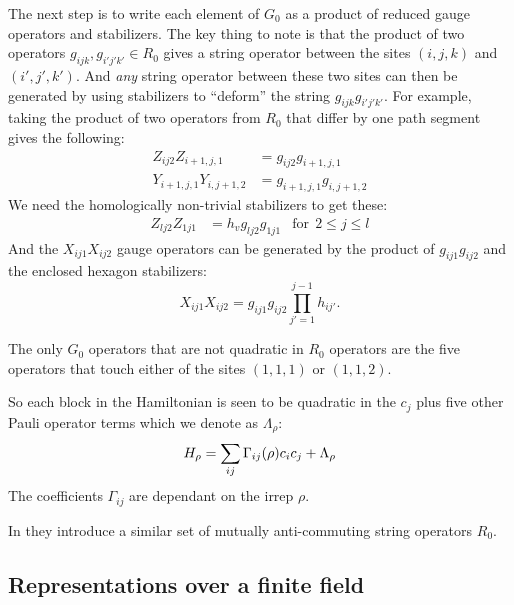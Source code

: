 \documentclass[12pt]{article}
\begin{document}
The next step is to write each element of $G_0$
as a product of reduced gauge operators and stabilizers.
The key thing to note is that the product of two
operators $g_{ijk}, g_{i'j'k'}\in R_0$ gives a string
operator between the sites $(i,j,k)$ and $(i',j',k')$.
And {\it any} string operator between these
two sites can then be generated by using stabilizers to
``deform'' the string $g_{ijk}g_{i'j'k'}.$
For example, taking the product
of two operators from $R_0$ that differ
by one path segment gives the following:
\begin{align*}
Z_{ij2}Z_{i+1,j,1} &= g_{ij2} g_{i+1,j,1} \\
Y_{i+1,j,1}Y_{i,j+1,2} &= g_{i+1,j,1}g_{i,j+1,2}
\end{align*}
We need the homologically non-trivial stabilizers to get these:
\begin{align*}
Z_{lj2}Z_{1j1} &= h_v g_{lj2} g_{1j1} &\mbox{for}\ \  2\le j\le l
\end{align*}
And the $X_{ij1}X_{ij2}$
gauge operators can be generated
by the product of 
$g_{ij1}g_{ij2}$ and the enclosed hexagon stabilizers:
$$X_{ij1}X_{ij2}=g_{ij1}g_{ij2}\prod_{j'=1}^{j-1} h_{ij'}.$$

The only $G_0$ operators that are not 
quadratic in $R_0$ operators are the five
operators that touch either of the sites
$(1,1,1)$ or $(1,1,2)$.

So each block in the Hamiltonian
is seen to be quadratic in the $c_j$ plus
five other Pauli operator terms which we denote as $\Lambda_\rho$:
$$
    H_\rho = \sum_{ij} \Gamma_{ij}(\rho) c_i c_j + \Lambda_\rho
$$
The coefficients $\Gamma_{ij}$ are dependant on the irrep $\rho.$

In \cite{Kells2009} they introduce a similar set of
mutually anti-commuting string operators $R_0.$


%

\subsection{Representations over a finite field}
\end{document}
